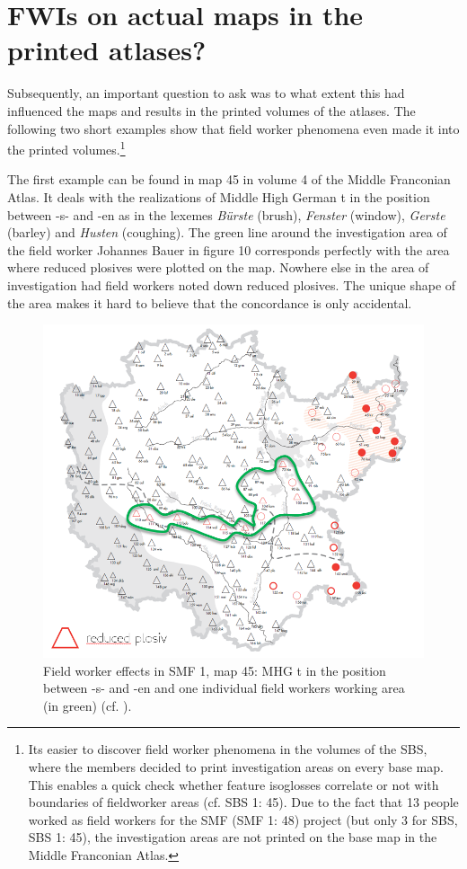 \documentclass[output=paper]{LSP/langsci}
\begin{document}
\section{FWIs on actual maps in the printed atlases?}
Subsequently, an important question to ask was to what extent this had influenced the maps and results in the printed volumes of the atlases. The following two short examples show that field worker phenomena even made it into the printed volumes.\footnote{It{\textquotesingle}s easier to discover field worker phenomena in the volumes of the SBS, where the members decided to print investigation areas on every base map. This enables a quick check whether feature isoglosses correlate or not with boundaries of fieldworker areas (cf. SBS 1: 45). Due to the fact that 13 people worked as field workers for the SMF (SMF 1: 48) project (but only 3 for SBS, SBS 1: 45), the investigation areas are not printed on the base map in the Middle Franconian Atlas.}

The first example can be found in map 45 in volume 4 of the Middle Franconian Atlas. It deals with the realizations of Middle High German t in the position between -s- and -en as in the lexemes \textit{Bürste} ({\textquotesingle}brush{\textquotesingle}), \textit{Fenster} ({\textquotesingle}window{\textquotesingle}), \textit{Gerste} ({\textquotesingle}barley{\textquotesingle}) and \textit{Husten} ({\textquotesingle}coughing{\textquotesingle}). The green line around the investigation area of the field worker Johannes Bauer in figure 10 corresponds perfectly with the area where reduced plosives were plotted on the map. Nowhere else in the area of investigation had field workers noted down reduced plosives. The unique shape of the area makes it hard to believe that the concordance is only accidental.

\begin{figure}
\includegraphics[width=.7\textwidth]{illustrations/mathus_fig11}
\caption{Field worker effects in SMF 1, map 45: MHG t in the position between -s- and -en \newline
and one individual field worker{\textquotesingle}s working area (in green) (cf. \citealt[240]{mathussek_sprachraume_2014}).}
\label{fig:11}
\end{figure}
\end{document}
